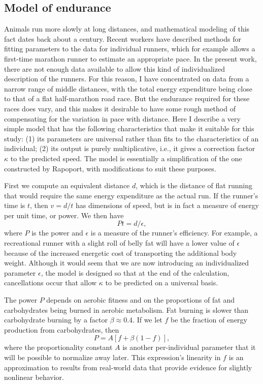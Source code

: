 \documentclass[10pt,letterpaper]{article}
\begin{document}
\subsection{Model of endurance}\label{subsec:endurance}

Animals run more slowly at long distances, and mathematical modeling of this fact dates back
about a century.\cite{hill}  Recent workers have described methods for fitting parameters
to the data for individual runners,\cite{rapoport}\cite{emig} which for example allows
a first-time marathon runner to estimate an appropriate pace. In the present work, there are
not enough data available to allow this kind of individualized description of the runners.
For this reason, I have concentrated on data from a narrow range of middle distances,
with the total energy expenditure being close to that of a flat half-marathon road race.
But the endurance required for these races does vary, and this makes it desirable to have
some rough method of compensating for the variation in pace with distance. Here I describe
a very simple model that has the following characteristics that make it suitable for this
study: (1) its parameters are universal rather than fits to the characteristics of an individual;
(2) its output is purely multiplicative, i.e., it gives a correction factor $\kappa$ to the predicted speed.
The model is essentially a simplification of the one constructed by Rapoport,\cite{rapoport} with modifications
to suit these purposes.

First we compute an equivalent distance $d$, which is the distance of flat running that would
require the same energy expenditure as the actual run. If the runner's time is $t$, then
$v=d/t$ has dimensions of speed, but is in fact a measure of energy per unit time, or power.
We then have
\begin{equation}\label{eq:fuel-model-1}
  Pt=d/\epsilon,
\end{equation}
where $P$ is the power and $\epsilon$ is a measure of the runner's efficiency. For example,
a recreational runner with a slight roll of belly fat will have a lower value of $\epsilon$ because of
the increased energetic cost of transporting the additional body weight. Although it would seem that
we are now introducing an individualized parameter $\epsilon$, the model is designed so that at the
end of the calculation, cancellations occur that allow $\kappa$ to be predicted on a universal basis.

The power $P$ depends on aerobic fitness and on the proportions of fat and carbohydrates being
burned in aerobic metabolism. Fat burning is slower than carbohydrate burning by a factor $\beta\approx 0.4$.\cite{rapoport}
If we let $f$ be the fraction of energy production from carbohydrates, then
\begin{equation}\label{eq:fuel-model-2}
  P = A[f+\beta(1-f)],
\end{equation}
where the proportionality constant $A$ is another per-individual parameter that it will be
possible to normalize away later. This expression's linearity in $f$ is an approximation to
results from real-world data that provide evidence for slightly nonlinear behavior.\cite{rapoport}
\end{document}
